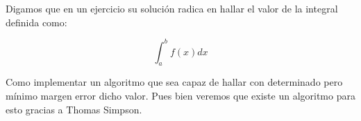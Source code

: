 Digamos que en un ejercicio su solución radica en hallar el valor de la integral definida como:

$$\int_a ^ b f (x) dx$$

Como implementar un algoritmo que sea  capaz de hallar con determinado pero mínimo margen error dicho valor. Pues bien veremos que existe un algoritmo para esto gracias a Thomas Simpson.  